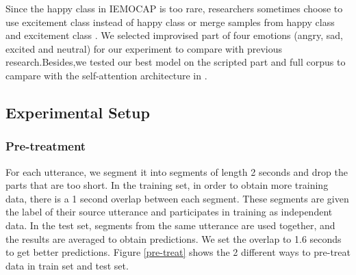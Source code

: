 \documentclass[10pt, conference, compsocconf]{IEEEtran}
\begin{document}
Since the happy class in IEMOCAP is too rare, researchers sometimes choose to use excitement class instead of happy class \cite{tarantino2019self,chernykh2017emotion} or merge samples from happy class and excitement class \cite{zhao2019attention,neumann2019improving}. We selected improvised part of four emotions (angry, sad, excited and neutral) for our experiment to compare with previous research.Besides,we
tested our best model on the scripted part and full corpus to campare with the self-attention architecture in \cite{tarantino2019self}.
 
\subsection{Experimental Setup}
\subsubsection{Pre-treatment}
For each utterance, we segment it into segments of length 2 seconds and drop the parts that are too short. In the training set, in order to obtain more training data, there is a 1 second overlap between each segment. These segments are given the label of their source utterance and participates in training as independent data. In the test set, segments from the same utterance are used together, and the results are averaged to obtain predictions. We set the overlap to 1.6 seconds to get better predictions.
Figure \ref{pre-treat} shows the 2 different ways to pre-treat data in train set and test set.
\end{document}
